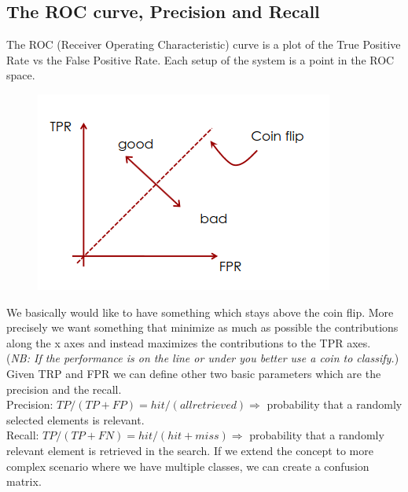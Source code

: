 \subsection{The ROC curve, Precision and Recall}
The ROC (Receiver Operating Characteristic) curve is a plot of the True Positive Rate vs the False Positive Rate. Each setup of the system is a point in the ROC space.
\begin{figure}[h]
    \centering
    \includegraphics[scale=0.5]{Figures/ROC.png}
\end{figure}
We basically would like to have something which stays above the coin flip. More precisely we want something that minimize as much as possible the contributions along the x axes and instead maximizes the contributions to the TPR axes.
\\(\textit{NB: If the performance is on the line or under you better use a coin to classify.})
Given TRP and FPR we can define other two basic parameters which are the precision and the recall.
\\Precision: $TP/(TP+FP) = hit/(all retrieved) \Rightarrow$ probability that a randomly selected elements is relevant.
\\Recall: $TP/(TP+FN) = hit/(hit+miss) \Rightarrow$ probability that a randomly relevant element is retrieved in the search.
If we extend the concept to more complex scenario where we have multiple classes, we can create a confusion matrix. 
